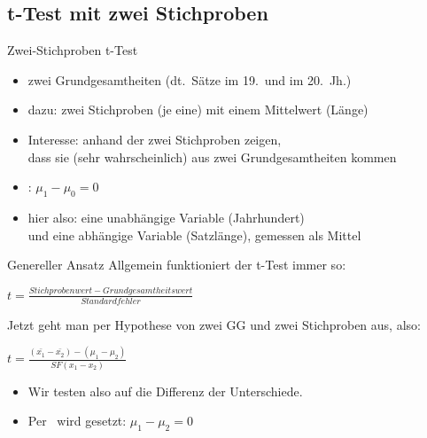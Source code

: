 \subsection{t-Test mit zwei Stichproben}

\begin{frame}
  {Zwei-Stichproben t-Test}
  \begin{itemize}[<+->]
    \item \alert{zwei Grundgesamtheiten} (\zB dt.\ Sätze im 19.\ und im 20.\ Jh.)
    \item dazu: \alert{zwei Stichproben} (je eine) mit einem \alert{Mittelwert} (\zB Länge)
    \item Interesse: anhand der \alert{zwei Stichproben} zeigen,\\
      dass sie (sehr wahrscheinlich) \alert{aus zwei Grundgesamtheiten} kommen
    \item \alert{\Null: $\mu_1-\mu_0=0$}
    \item hier also: eine unabhängige Variable (Jahrhundert)\\
      und eine abhängige Variable (Satzlänge), gemessen als Mittel
  \end{itemize}
\end{frame}

\begin{frame}
  {Genereller Ansatz}
  Allgemein funktioniert der t-Test \alert{immer} so:
  \begin{center}
    \alert{$t=\frac{Stichprobenwert-Grundgesamtheitswert}{Standardfehler}$}
  \end{center}
  \pause
  Jetzt geht man per Hypothese von zwei GG und zwei Stichproben aus, also:
  \pause
  \begin{center}
    \alert{$t=\frac{(\bar{x_1}-\bar{x_2})-(\mu_1-\mu_2)}{SF(x_1-x_2)}$}
  \end{center}
  \pause
  \begin{itemize}[<+->]
    \item Wir testen also auf die \alert{Differenz der Unterschiede}.
    \item Per \Null\ wird gesetzt: \alert{$\mu_1-\mu_2=0$}
  \end{itemize} 
\end{frame}


